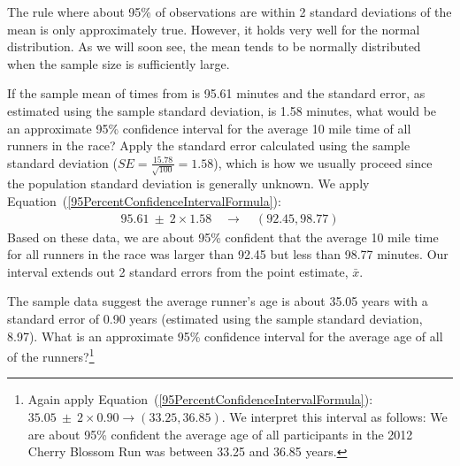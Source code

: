 The rule where about 95\% of observations are within 2 standard deviations of the mean is only approximately true. However, it holds very well for the normal distribution. As we will soon see, the mean tends to be normally distributed when the sample size is sufficiently large. 

\begin{example}{If the sample mean of times from  is 95.61 minutes and the standard error, as estimated using the sample standard deviation, is 1.58 minutes, what would be an approximate 95\% confidence interval for the average 10 mile time of all runners in the race? Apply the standard error calculated using the sample standard deviation ($SE=\frac{15.78}{\sqrt{100}} = 1.58$), which is how we usually proceed since the population standard deviation is generally unknown.}
We apply Equation~(\ref{95PercentConfidenceIntervalFormula}):
\begin{eqnarray*}
95.61\ \pm\ 2 \times  1.58 \quad \rightarrow \quad (92.45, 98.77)
\end{eqnarray*}
Based on these data, we are about 95\% confident that the average 10 mile time for all runners in the race was larger than 92.45 but less than 98.77 minutes. Our interval extends out 2 standard errors from the point estimate, $\bar{x}$.
\end{example}

\begin{exercise} \label{95CIExerciseForAgeOfRun10Samp1}
The sample data suggest the average runner's age is about 35.05 years with a standard error of 0.90 years (estimated using the sample standard deviation, 8.97). What is an approximate 95\% confidence interval for the average age of all of the runners?\footnote{Again apply Equation~(\ref{95PercentConfidenceIntervalFormula}): $35.05 \ \pm \ 2\times 0.90 \rightarrow (33.25, 36.85)$. We interpret this interval as follows: We are about 95\% confident the average age of all participants in the 2012 Cherry Blossom Run was between 33.25 and 36.85 years.}
\end{exercise}

